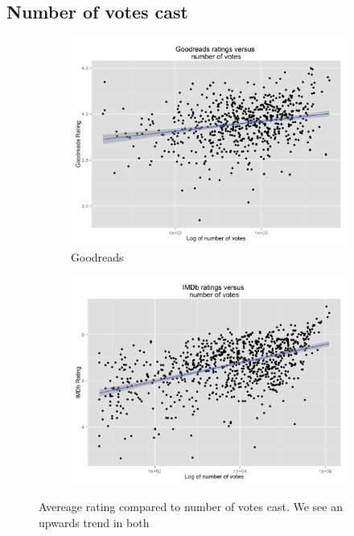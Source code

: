 \documentclass[12pt]{article}
\begin{document}
\subsection{Number of votes cast}

\begin{figure}[!ht]
  \begin{subfigure}[b]{.5\linewidth}
    \centering
    \includegraphics[scale=0.1]{ratingsbooks}
    \caption{Goodreads}
    \label{fig:1a}
  \end{subfigure}%
  \begin{subfigure}[b]{.5\linewidth}
    \centering
    \includegraphics[scale=0.1]{ratingsimdb}
    \label{fig:1b}
  \end{subfigure}
  \caption{Avereage rating compared to number of votes cast. We see an upwards trend in both}
  \label{fig:1}
\end{figure}
\end{document}
